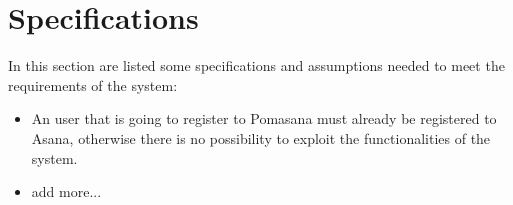 	\section{Specifications}

	In this section are listed some specifications and assumptions needed to meet the requirements of the system:

		\begin{itemize}

			\item An user that is going to register to Pomasana must already be registered to Asana, otherwise there is no possibility to exploit the functionalities of the system.

			\item add more...


		\end{itemize}

